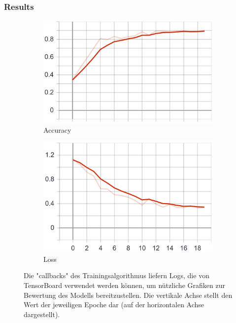 \subsubsection{Results}
\begin{figure}
    \centering
    \begin{subfigure}[b]{0.4\textwidth}
        \includegraphics[width=\textwidth]{images/first_model_acc.png}
        \caption{Accuracy}
        \label{fig:first_model_acc}
    \end{subfigure}
    \begin{subfigure}[b]{0.4\textwidth}
        \includegraphics[width=\textwidth]{images/first_model_loss.png}
        \caption{Loss}
        \label{fig:first_model_loss}
    \end{subfigure}
    \caption{Die "callbacks" des Trainingsalgorithmus liefern Logs, die von TensorBoard verwendet werden können, um nützliche Grafiken zur Bewertung des Modells bereitzustellen. Die vertikale Achse stellt den Wert der jeweiligen Epoche dar (auf der horizontalen Achse dargestellt).}
    \label{fig:first_model_graphs}
\end{figure}

